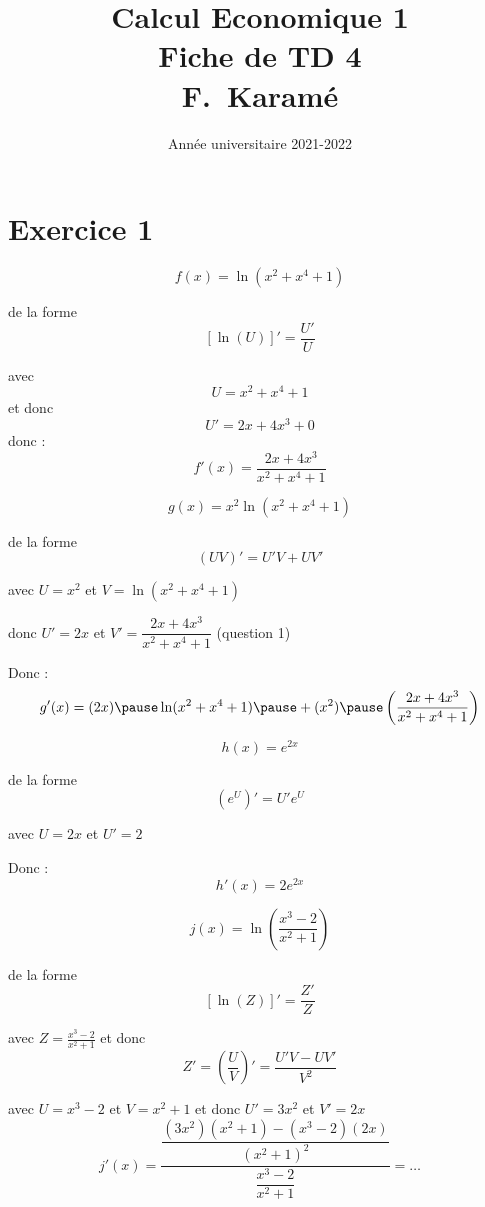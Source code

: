 \documentclass[9pt,handout,professionalfonts,hyperref]{beamer}
\title{Calcul Economique 1\\Fiche de TD 4\\F.~Karamé}
\date{Année universitaire 2021-2022}
\begin{document}
\begin{frame}
\titlepage
\end{frame}

\section{Exercice 1}

\begin{frame}
$$f(x)=\ln(x^2+x^4+1)$$

\pause de la forme $$[\ln(U)]'=\frac{U'}{U}$$

\pause
avec $$U=x^2+x^4+1$$
et donc
\pause $$U'=2x+4x^3+0$$
\medskip
\pause donc :
\pause
$$f'(x)=\dfrac{2x+4x^3}{x^2+x^4+1}$$

\end{frame}

\begin{frame}

$$
g(x)=x^2\ln(x^2+x^4+1)
$$

\pause de la forme $$(UV)'=U'V+UV'$$

\medskip

\pause avec $U=x^2$ et $V=\ln(x^2+x^4+1)$

\pause
\medskip

donc $U'=2x$ \pause et $V'=\dfrac{2x+4x^3}{x^2+x^4+1}$ (question 1)
 \pause
\medskip

Donc :
$$
g'(x)=(2x)\pause\ln(x^2+x^4+1)\pause+(x^2)\pause\left(\dfrac{2x+4x^3}{x^2+x^4+1}\right)
$$

\end{frame}


\begin{frame}

$$
h(x)=e^{2x}
$$

 \pause de la forme $$(e^U)'=U'e^U$$

 \medskip
\pause avec $U=2x$ et $U'=2$
 \pause
\medskip

Donc :
$$
h'(x)=2e^{2x}
$$

\end{frame}


\begin{frame}

$$
j(x)=\ln\left(\dfrac{x^3-2}{x^2+1}\right)
$$

 \pause de la forme $$[\ln(Z)]'=\frac{Z'}{Z}$$
 \medskip

\pause  avec $Z=\frac{x^3-2}{x^2+1}$ \pause et donc $$Z'=\left(\frac{U}{V}\right)'=\frac{U'V-UV'}{V^2}$$
\pause

avec $U = x^3-2$ et $V=x^2+1$ \pause et donc $U' = 3x^2$ \pause et $V'=2x$ \\
\medskip
\pause
$$j'(x)=\frac{\dfrac{(3x^2)(x^2+1)-(x^3-2)(2x)}{(x^2+1)^2}}{\dfrac{x^3-2}{x^2+1}}=\dots$$

\end{frame}
\end{document}
